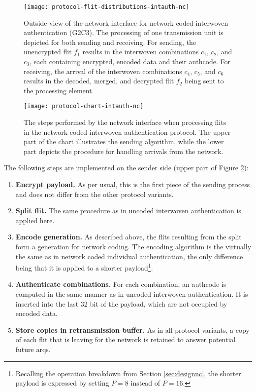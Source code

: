 \begin{figure}
    \centering
    \texttt{[image: protocol-flit-distributions-intauth-nc]}
    \caption[Network coded int. auth., outside view]{Outside view of the network interface for network coded interwoven authentication (G2C3). The
    processing of one transmission unit is depicted for both sending and receiving. For sending, the unencrypted flit $f_1$ results in the interwoven
    combinations $c_1$, $c_2$, and $c_3$, each containing encrypted, encoded data and their authcode. For receiving, the arrival of the interwoven
    combinations $c_4$, $c_5$, and $c_6$ results in the decoded, merged, and decrypted flit $f_2$ being sent to the processing element.}
    \label{fig:protflitdistintauthnc}
\end{figure}

\begin{figure}
    \centering
    \texttt{[image: protocol-chart-intauth-nc]}
    \caption[Network coded int. auth., detailed procedure]{The steps performed by the network interface when processing flits in the network coded
    interwoven authentication protocol. The upper part of the chart illustrates the sending algorithm, while the lower part depicts the procedure for
    handling arrivals from the network.}
    \label{fig:protchartintauthnc}
\end{figure}

The following steps are implemented on the sender side (upper part of Figure \ref{fig:protchartintauthnc}):
\begin{enumerate}
    \item \textbf{Encrypt payload.} As per usual, this is the first piece of the sending process and does not differ from the other protocol variants.
    \item \textbf{Split flit.} The same procedure as in uncoded interwoven authentication is applied here.
    \item \textbf{Encode generation.} As described above, the flits resulting from the split form a generation for network coding. The encoding
        algorithm is the virtually the same as in network coded individual authentication, the only difference being that it is applied to a shorter
        payload\footnote{Recalling the operation breakdown from Section \ref{sec:designnc}, the shorter payload is expressed by setting $P=8$ instead
        of $P=16$.}.
    \item \textbf{Authenticate combinations.} For each combination, an authcode is computed in the same manner as in uncoded interwoven
        authentication. It is inserted into the last 32 bit of the payload, which are not occupied by encoded data.
    \item \textbf{Store copies in retransmission buffer.} As in all protocol variants, a copy of each flit that is leaving for the network is retained
        to answer potential future \glspl{arq}.
\end{enumerate}
\vspace{0.5\baselineskip}

